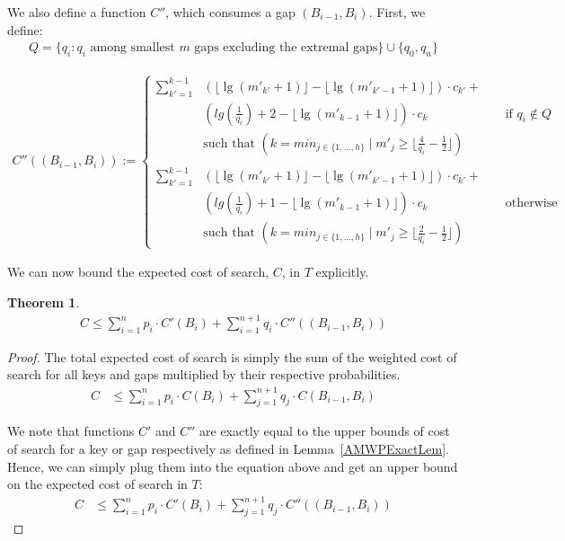 \documentclass[letterpaper,12pt,titlepage,oneside,final]{book}
\theoremstyle{plain}
\newtheorem{thm}{Theorem}[section]
\begin{document}
We also define a function $C''$, which consumes a gap $(B_{i-1},B_i)$. First, we define:
\begin{align*}
Q = \{q_i : q_i \text{ among smallest }m \text{ gaps excluding the extremal gaps} \} \cup \{q_0, q_n\}
\end{align*}

\begin{align*}
C''((B_{i-1},B_i)) :=
\begin{cases}
\sum_{k'=1}^{k-1} &\left(\lfloor \lg(m'_{k'}+1) \rfloor - \lfloor \lg(m'_{k'-1}+1) \rfloor \right)\cdot c_{k'} + \\
 &\left(lg(\frac{1}{q_i}) + 2 - \lfloor \lg(m'_{k-1}+1) \rfloor \right)\cdot c_k \hspace{70pt} \text{ if } q_i \not\in Q \\
&\text{such that } \left( k=min_{j \in \{1, ..., h\}} \mid m'_j \geq \lfloor \frac{4}{q_i}-\frac{1}{2} \rfloor \right) \\ \\
\sum_{k'=1}^{k-1} &\left(\lfloor \lg(m'_{k'}+1) \rfloor - \lfloor \lg(m'_{k'-1}+1) \rfloor \right)\cdot c_{k'}+ \\
&\left(lg(\frac{1}{q_i}) + 1 - \lfloor \lg(m'_{k-1}+1) \rfloor \right)\cdot c_k \hspace{70pt} \text{ otherwise}\\
&\text{such that } \left( k=min_{j \in \{1, ..., h\}} \mid m'_j \geq \lfloor \frac{2}{q_i}-\frac{1}{2} \rfloor \right)
\end{cases}
\end{align*}

We can now bound the expected cost of search, $C$, in $T$ explicitly.

\begin{thm} \label{ExactApproxMWPagingThm}
\begin{align*}
C \leq \sum_{i=1}^{n} p_i\cdot  C'(B_i) + \sum_{i=1}^{n+1} q_i\cdot C''((B_{i-1},B_i)) 
\end{align*}

\end{thm}

\begin{proof}
The total expected cost of search is simply the sum of the weighted cost of search for all keys and gaps multiplied by their respective probabilities.
\begin{align*}
C &\leq \sum_{i=1}^{n} p_i\cdot C(B_i) + \sum_{j=1}^{n+1} q_j\cdot C(B_{i-1},B_i) 
\end{align*}

We note that functions $C'$ and $C''$ are exactly equal to the upper bounds of cost of search for a key or gap respectively as defined in Lemma~\ref{AMWPExactLem}. Hence, we can simply plug them into the equation above and get an upper bound on the expected cost of search in $T$:
\begin{align*}
C &\leq \sum_{i=1}^{n} p_i\cdot C'(B_i) + \sum_{j=1}^{n+1} q_j\cdot C''((B_{i-1},B_i))
\end{align*}


\end{proof}
\end{document}
